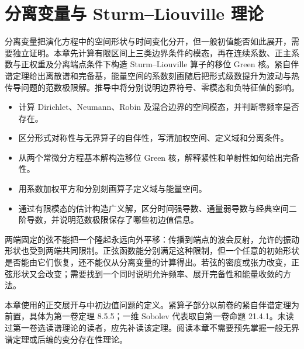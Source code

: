 \chapter{分离变量与 Sturm–Liouville 理论}
\label{b2:ch:10}
\begin{chapterabstract}
分离变量把演化方程中的空间形状与时间变化分开，但一般初值能否如此展开，需要独立证明。本章先计算有限区间上三类边界条件的模态，再在连续系数、正主系数与正权重及分离端点条件下构造 Sturm--Liouville 算子的移位 Green 核。紧自伴谱定理给出离散谱和完备基，能量空间的系数刻画随后把形式级数提升为波动与热传导问题的范数极限解。推导中将分别说明边界符号、零模态和负特征值的影响。
\end{chapterabstract}

\begin{learninggoals}
\begin{itemize}
\item\label{b2:item:10-goal-modes}计算 Dirichlet、Neumann、Robin 及混合边界的空间模态，并判断零频率是否存在。
\item\label{b2:item:10-goal-domain}区分形式对称性与无界算子的自伴性，写清加权空间、定义域和分离条件。
\item\label{b2:item:10-goal-green}从两个常微分方程基本解构造移位 Green 核，解释紧性和单射性如何给出完备性。
\item\label{b2:item:10-goal-energy}用系数加权平方和分别刻画算子定义域与能量空间。
\item\label{b2:item:10-goal-limit}通过有限模态的估计构造广义解，区分时间强导数、通量弱导数与经典空间二阶导数，并说明范数极限保存了哪些初边值信息。
\end{itemize}
\end{learninggoals}

两端固定的弦不能把一个隆起永远向外平移：传播到端点的波会反射，允许的振动形状也受到两端共同限制。正弦函数能分别满足这种限制，但一个任意的初始形状是否能由它们恢复，还不能仅从分离变量的计算得出。若弦的密度或张力改变，正弦形状又会改变；需要找到一个同时说明允许频率、展开完备性和能量收敛的方法。

\ProseParagraphBreak

本章使用的正交展开与中初边值问题的定义。紧算子部分以前卷的紧自伴谱定理为前置，具体为第一卷定理 8.5.5；一维 Sobolev 代表取自第一卷命题 21.4.1。未读过第一卷选读谱理论的读者，应先补读该定理。阅读本章不需要预先掌握一般无界谱定理或后编的变分存在性理论。

